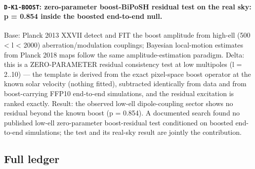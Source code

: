 \documentclass[10pt]{article}
\theoremstyle{definition}
\newcommand{\code}[1]{\texttt{\small #1}}
\begin{document}
\paragraph{\code{D-K1-BOOST}: zero-parameter boost-BiPoSH residual test on the real sky: p = 0.854 inside the boosted end-to-end null.}
Base: Planck 2013 XXVII detect and FIT the boost amplitude from high-ell (500 < l < 2000) aberration/modulation couplings; Bayesian local-motion estimates from Planck 2018 maps follow the same amplitude-estimation paradigm. Delta: this is a ZERO-PARAMETER residual consistency test at low multipoles (l = 2..10) — the template is derived from the exact pixel-space boost operator at the known solar velocity (nothing fitted), subtracted identically from data and from boost-carrying FFP10 end-to-end simulations, and the residual excitation is ranked exactly. Result: the observed low-ell dipole-coupling sector shows no residual beyond the known boost (p = 0.854). A documented search found no published low-ell zero-parameter boost-residual test conditioned on boosted end-to-end simulations; the test and its real-sky result are jointly the contribution.


\subsection{Full ledger}
\end{document}
